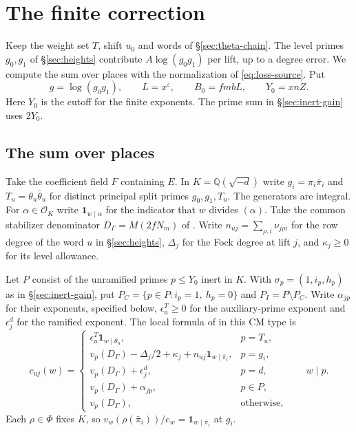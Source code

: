 \section{The finite correction}\label{sec:finite-correction}

Keep the weight set $T$, shift $u_0$ and words of \S\ref{sec:theta-chain}.
The level primes $g_0,g_1$ of \S\ref{sec:heights} contribute
$A\log(g_0g_1)$ per lift, up to a degree error. We compute the sum
over places with the normalization of \eqref{eq:loss-source}. Put
\[
 g=\log(g_0g_1),\qquad L=x^\varepsilon,\qquad B_0=fmbL,\qquad Y_0=xnZ .
\]
Here $Y_0$ is the cutoff for the finite exponents. The prime sum in
\S\ref{sec:inert-gain} uses $2Y_0$.

\subsection{The sum over places}

Take the coefficient field $F$ containing $E$. In $K=\mathbb Q(\sqrt{-d})$
write $g_i=\pi_i\bar\pi_i$ and $T_u=\theta_u\bar\theta_u$ for distinct
principal split primes $g_0,g_1,T_u$. The generators are integral.
For $\alpha\in\mathcal O_K$ write $\mathbf1_{w\mid\alpha}$ for the
indicator that $w$ divides $(\alpha)$. Take the common stabilizer
denominator $D_\Gamma=M(2fN_m)$ of
\citep[Definition~11.12 and Theorem~11.13]{adriazola-grh}.
Write $n_{uj}=\sum_{\rho,i}
\nu_{j\rho i}$ for the row degree of the word $u$ in
\S\ref{sec:heights}, $\Delta_j$ for the Fock degree at lift $j$, and
$\kappa_j\ge0$ for its level allowance.

Let $P$ consist of the unramified primes $p\le Y_0$ inert in $K$.
With $\sigma_p=(1,i_p,h_p)$ as in \S\ref{sec:inert-gain}, put
$P_C=\{p\in P:i_p=1,\ h_p=0\}$ and $P_I=P\setminus P_C$.
Write $\alpha_{jp}$ for their exponents, specified below,
$\epsilon_u^T\ge0$ for the auxiliary-prime exponent and $\epsilon_j^d$ for the
ramified exponent. The local formula of
\citep[Definition~16.5]{adriazola-grh} in this CM type is
\begin{equation}\label{eq:finite-table}
 c_{uj}(w)=
 \begin{cases}
   \epsilon_u^T\mathbf1_{w\mid\theta_u},&p=T_u,\\
   v_p(D_\Gamma)-\Delta_j/2+\kappa_j+
                  n_{uj}\mathbf1_{w\mid\bar\pi_i},&p=g_i,\\
   v_p(D_\Gamma)+\epsilon_j^d,&p=d,\\
   v_p(D_\Gamma)+\alpha_{jp},&p\in P,\\
   v_p(D_\Gamma),&\text{otherwise},
 \end{cases}\qquad w\mid p .
\end{equation}
Each $\rho\in\Phi$ fixes $K$, so
$v_w(\rho(\bar\pi_i))/e_w=\mathbf1_{w\mid\bar\pi_i}$ at $g_i$.

